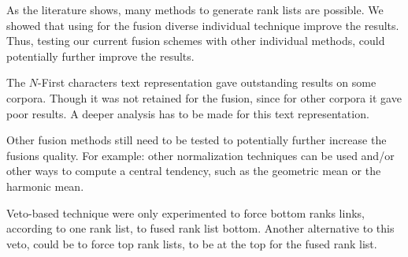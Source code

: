 As the literature shows, many methods to generate rank lists are possible.
We showed that using for the fusion diverse individual technique improve the results.
Thus, testing our current fusion schemes with other individual methods, could potentially further improve the results.

The $N$-First characters text representation gave outstanding results on some corpora.
Though it was not retained for the fusion, since for other corpora it gave poor results.
A deeper analysis has to be made for this text representation.

Other fusion methods still need to be tested to potentially further increase the fusions quality.
For example: other normalization techniques can be used and/or other ways to compute a central tendency, such as the geometric mean or the harmonic mean.

Veto-based technique were only experimented to force bottom ranks links, according to one rank list, to fused rank list bottom.
Another alternative to this veto, could be to force top rank lists, to be at the top for the fused rank list.
